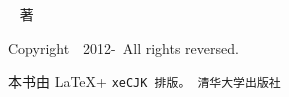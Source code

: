 \makeatletter

\begin{center}


{\fontsize{2cm}{2.5cm}\selectfont \xingkai{} \@title}


\vskip 5cm

 {\LARGE \@author ~ 著
 
 \null
 \vskip 3cm  }

Copyright~\textcopyright~2012-\the\year~All rights reversed.



\end{center}

\null
\vfill



\begin{flushright}
本书由 \LaTeX + \tt{xeCJK} 排版。 \hfill 清华大学出版社
\end{flushright}
\makeatother 
